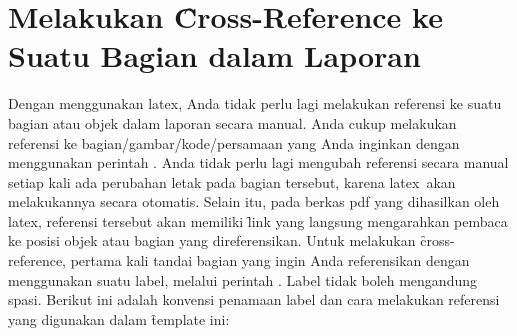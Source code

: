 \section{Melakukan \f{Cross-Reference} ke Suatu Bagian dalam Laporan}
\label{sec:crossReference}
Dengan menggunakan \gls{latex}, Anda tidak perlu lagi melakukan referensi ke suatu bagian atau objek dalam laporan secara manual.
Anda cukup melakukan referensi ke bagian/gambar/kode/persamaan yang Anda inginkan dengan menggunakan perintah .
Anda tidak perlu lagi mengubah referensi secara manual setiap kali ada perubahan letak pada bagian tersebut, karena \gls{latex}~akan melakukannya secara otomatis.
Selain itu, pada berkas \acrfull{pdf} yang dihasilkan oleh \gls{latex}, referensi tersebut akan memiliki \f{link} yang langsung mengarahkan pembaca ke posisi objek atau bagian yang direferensikan.
Untuk melakukan \f{cross-reference}, pertama kali tandai bagian yang ingin Anda referensikan dengan menggunakan suatu label, melalui perintah .
Label tidak boleh mengandung spasi. Berikut ini adalah konvensi penamaan label dan cara melakukan referensi yang digunakan dalam \f{template} ini:
